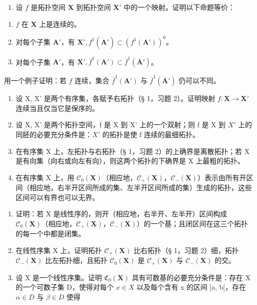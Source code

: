 \BourbakiExerciseGroup

\begin{enumerate}
\def\labelenumi{\arabic{enumi})}
\tightlist
\item
  设 \(f\) 是拓扑空间 \(\mathbf{X}\) 到拓扑空间 \(\mathbf{X}'\) 中的一个映射。证明以下命题等价：
\end{enumerate}

\begin{enumerate}
\def\labelenumi{\alph{enumi})}
\item
  \(f\) 在 \(\mathbf{X}\) 上是连续的。
\item
  对每个子集 \(\mathbf{A}'\)，有 \(\mathbf{X}', f^1 (\mathring{\mathbf{A}}') \subset (f^1 (\mathbf{A}'))^0\)。
\item
  对每个子集 \(\mathbf{A}'\)，有 \(\mathbf{X}', \overline{f}^1 (\mathbf{A}') \subset \overline{f}^1 (\overline{\mathbf{A}}')\)。
\end{enumerate}

用一个例子证明：若 \(f\) 连续，集合 \(\overline{f}^1 (\mathbf{A}')\) 与 \(\overline{f}^1 (\overline{\mathbf{A}}')\) 仍可以不同。

\begin{enumerate}
\def\labelenumi{\arabic{enumi})}
\setcounter{enumi}{1}
\item
  设 X, X' 是两个有序集，各赋予右拓扑（§ 1，习题 2）。证明映射 \(f: \mathbf{X} \to \mathbf{X}'\) 连续当且仅当它是保序的。
\item
  设 X, X' 是两个拓扑空间，f 是 X 到 X' 上的一个双射；则 f 是 X 到 \(X'\) 上的同胚的必要充分条件是：\(X'\) 的拓扑是使 f 连续的最细拓扑。
\item
  在有序集 X 上，左拓扑与右拓扑（§ 1，习题 2）的上确界是离散拓扑；若 X 是有向集（向右或向左有向），则这两个拓扑的下确界是 X 上最粗的拓扑。
\item
  在有序集 X 上，用 \(\mathcal{C}_{0}(\mathbf{X})\)（相应地，\(\mathcal{C}_{+}(\mathbf{X})\)，\(\mathcal{C}_{-}(\mathbf{X})\)）表示由所有开区间（相应地，右半开区间所成的集、左半开区间所成的集）生成的拓扑，这些区间可以有界也可以无界。
\end{enumerate}

\begin{enumerate}
\def\labelenumi{\alph{enumi})}
\item
  证明：若 X 是线性序的，则开（相应地，右半开、左半开）区间构成 \(\mathcal{C}_{0}(\mathbf{X})\)（相应地，\(\mathcal{C}_{+}(\mathbf{X})\)，\(\mathcal{C}_{-}(\mathbf{X})\)）的一个基；且闭区间在这三个拓扑的每一个中都是闭集。
\item
  在线性序集 X 上，证明拓扑 \(\mathcal{C}_{+}(\mathbf{X})\) 比右拓扑（§ 1，习题 2）细，拓扑 \(\mathcal{C}_{-}(\mathbf{X})\) 比左拓扑细，且拓扑 \(\mathcal{C}_{0}(\mathbf{X})\) 是 \(\mathcal{C}_{+}(\mathbf{X})\) 与 \(\mathcal{C}_{-}(\mathbf{X})\) 的交。
\item
  设 X 是一个线性序集。证明 \(\mathfrak{C}_{0}(\mathbf{X})\) 具有可数基的必要充分条件是：存在 X 的一个可数子集 D，使得对每个 \(x \in X\) 以及每个含有 x 的区间 {]}a, b{[}，存在 \(\alpha \in D\) 与 \(\beta \in D\) 使得
\end{enumerate}


